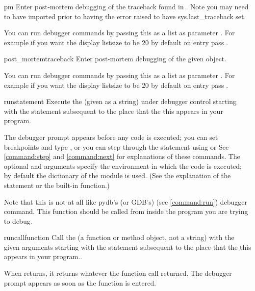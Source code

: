 \begin{funcdesc}{pm}{}
Enter post-mortem debugging of the traceback found in
. Note you may need to have 
imported prior to having the error raised to have sys.last_traceback
set.

You can run debugger commands by passing this as a list as parameter
. For example if you want the display listsize to be 20
by default on entry pass .
\end{funcdesc}

\begin{funcdesc}{post_mortem}{traceback }\label{post-mortem}
Enter post-mortem debugging of the given  object.

You can run debugger commands by passing this as a list as parameter
. For example if you want the display listsize to be 20
by default on entry pass .

\end{funcdesc}

\begin{funcdesc}{run}{statement}
Execute the  (given as a string) under debugger
control starting with the statement subsequent to the place that the
this appears in your program.

The debugger prompt appears before any code is executed; you can set
breakpoints and type , or you can step through the
statement using  or  See \ref{command:step} and
\ref{command:next} for explanations of these commands.  The optional
 and  arguments specify the environment in
which the code is executed; by default the dictionary of the module
 is used.  (See the explanation of the
 statement or the  built-in function.)

Note that this is not at all like pydb's (or GDB's)  (see
\ref{command:run}) debugger command. This function should be called
from inside the program you are trying to debug.
\end{funcdesc}

\begin{funcdesc}{runcall}{function}
Call the  (a function or method object, not a string)
with the given arguments starting with the statement subsequent to the
place that the this appears in your program..

When  returns, it returns
whatever the function call returned.  The debugger prompt appears as
soon as the function is entered.
\end{funcdesc}

